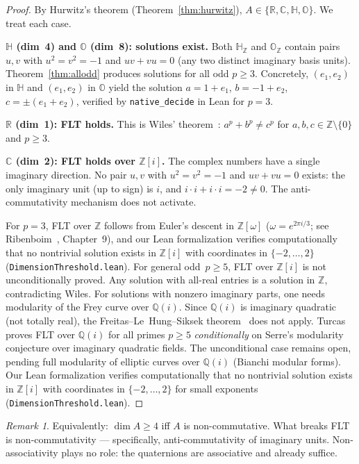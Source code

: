 \documentclass[11pt]{amsart}
\theoremstyle{plain}
\theoremstyle{definition}
\theoremstyle{remark}
\newtheorem{remark}[theorem]{Remark}
\newcommand{\Z}{\mathbb{Z}}
\newcommand{\Q}{\mathbb{Q}}
\newcommand{\R}{\mathbb{R}}
\newcommand{\C}{\mathbb{C}}
\newcommand{\HH}{\mathbb{H}}
\newcommand{\OO}{\mathbb{O}}
\begin{document}
\begin{proof}
By Hurwitz's theorem (Theorem~\ref{thm:hurwitz}), $A \in \{\R, \C, \HH, \OO\}$.
We treat each case.

\medskip\noindent\textbf{$\HH$ (dim~4) and $\OO$ (dim~8): solutions exist.}
Both $\HH_\Z$ and $\OO_\Z$ contain pairs $u, v$ with $u^2 = v^2 = -1$ and $uv + vu = 0$
(any two distinct imaginary basis units).
Theorem~\ref{thm:allodd} produces solutions for all odd $p \geq 3$.
Concretely, $(e_1, e_2)$ in $\HH$ and $(e_1, e_2)$ in $\OO$ yield the
solution $a = 1 + e_1$, $b = -1 + e_2$, $c = \pm(e_1 + e_2)$, verified by
\texttt{native\_decide} in Lean for $p = 3$.

\medskip\noindent\textbf{$\R$ (dim~1): FLT holds.}
This is Wiles' theorem~\cite{Wiles1995}: $a^p + b^p \neq c^p$ for
$a, b, c \in \Z \setminus \{0\}$ and $p \geq 3$.

\medskip\noindent\textbf{$\C$ (dim~2): FLT holds over $\Z[i]$.}
The complex numbers have a single imaginary direction.
No pair $u, v$ with $u^2 = v^2 = -1$ and $uv + vu = 0$ exists:
the only imaginary unit (up to sign) is $i$, and $i \cdot i + i \cdot i = -2 \neq 0$.
The anti-commutativity mechanism does not activate.

For $p = 3$, FLT over $\Z$ follows from Euler's descent
in $\Z[\omega]$ ($\omega = e^{2\pi i/3}$; see Ribenboim~\cite{Ribenboim1979},
Chapter~9), and our Lean formalization verifies computationally that no
nontrivial solution exists in $\Z[i]$ with coordinates in $\{-2, \ldots, 2\}$
(\texttt{DimensionThreshold.lean}).
For general odd~$p \geq 5$, FLT over $\Z[i]$ is not unconditionally proved.
Any solution with all-real entries is a solution in $\Z$,
contradicting Wiles.
For solutions with nonzero imaginary parts, one needs modularity
of the Frey curve over $\Q(i)$.
Since $\Q(i)$ is imaginary quadratic (not totally real),
the Freitas--Le~Hung--Siksek theorem~\cite{FLHS2015} does not apply.
Turcas~\cite{Turcas2018} proves FLT over $\Q(i)$ for all primes
$p \geq 5$ \emph{conditionally} on Serre's modularity conjecture
over imaginary quadratic fields.
The unconditional case remains open, pending full modularity
of elliptic curves over $\Q(i)$ (Bianchi modular forms).
Our Lean formalization verifies computationally that no
nontrivial solution exists in $\Z[i]$ with coordinates in $\{-2, \ldots, 2\}$
for small exponents (\texttt{DimensionThreshold.lean}).
\end{proof}

\begin{remark}
Equivalently: $\dim A \geq 4$ iff $A$ is non-commutative.
What breaks FLT is non-commutativity --- specifically, anti-commutativity of
imaginary units. Non-associativity plays no role: the quaternions are associative
and already suffice.
\end{remark}
\end{document}
